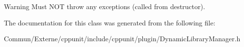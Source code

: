 \begin{DoxyWarning}{Warning}
Must N\+OT throw any exceptions (called from destructor). 
\end{DoxyWarning}


The documentation for this class was generated from the following file\+:\begin{DoxyCompactItemize}
\item 
Commun/\+Externe/cppunit/include/cppunit/plugin/Dynamic\+Library\+Manager.\+h\end{DoxyCompactItemize}
